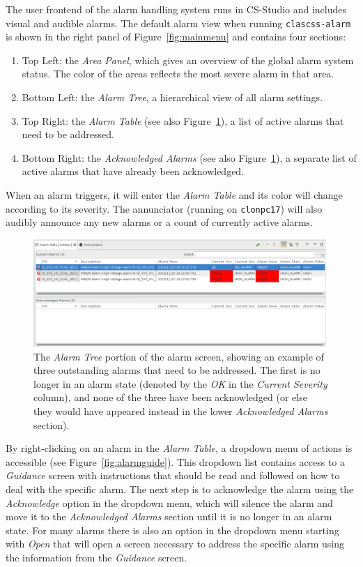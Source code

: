 \documentclass[amsmath,amssymb,notitlepage,11pt]{revtex4}
\begin{document}
The user frontend of the alarm handling system runs in CS-Studio and includes visual and audible alarms.  The default alarm view when running \texttt{clascss-alarm} is shown in the right panel of Figure~\ref{fig:mainmenu} and contains four sections:
\begin{enumerate}
    \item Top Left:  the {\em Area Panel}, which gives an overview of the global alarm system status.  The color of the areas reflects the most severe alarm in that area.
    \item Bottom Left:  the {\em Alarm Tree}, a hierarchical view of all alarm settings.
    \item  Top Right:  the {\em Alarm Table} (see also Figure~\ref{fig:alarmtable}), a list of active alarms that need to be addressed.
    \item Bottom Right:  the {\em Acknowledged Alarms} (see also Figure~\ref{fig:alarmtable}), a separate list of active alarms that have already been acknowledged.
\end{enumerate}
When an alarm triggers, it will enter the {\em Alarm Table} and its color will change according to its severity.  The annunciator (running on \texttt{clonpc17}) will also audibly announce any new alarms or a count of currently active alarms.
\begin{figure}[htbp]\centering
  \includegraphics[width=0.99\textwidth]{pics/alarmtree}
  \caption{The {\em Alarm Tree} portion of the alarm screen, showing an example of three outstanding alarms that need to be addressed.  The first is no longer in an alarm state (denoted by the {\em OK} in the {\em Current Severity} column), and none of the three have been acknowledged (or else they would have appeared instead in the lower {\em Acknowledged Alarms} section).\label{fig:alarmtable}}
\end{figure}

By right-clicking on an alarm in the {\em Alarm Table}, a dropdown menu of actions is accessible (see Figure~\ref{fig:alarmguide}).  This dropdown list contains access to a {\em Guidance} screen with instructions that should be read and followed on how to deal with the specific alarm.  The next step is to acknowledge the alarm using the {\em Acknowledge} option in the dropdown menu, which will silence the alarm and move it to the {\em Acknowledged Alarms} section until it is no longer in an alarm state.  For many alarms there is also an option in the dropdown menu starting with {\em Open} that will open a screen necessary to address the specific alarm using the information from the {\em Guidance} screen.
\end{document}
